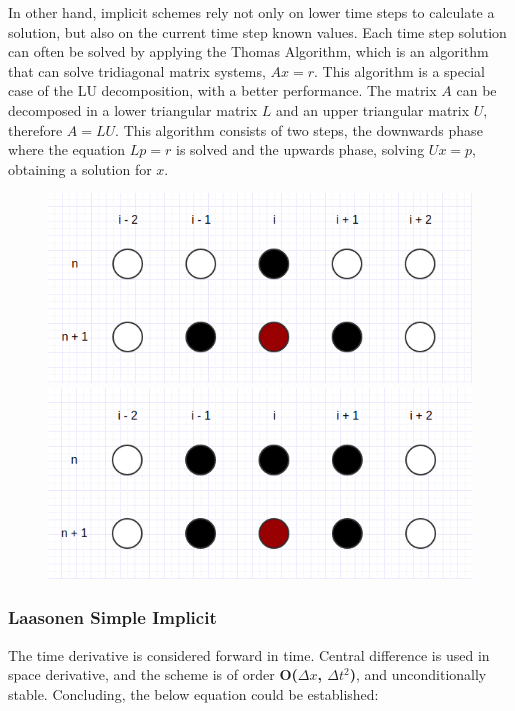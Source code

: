 \documentclass[12pt]{report}
\begin{document}
\par In other hand, implicit schemes rely not only on lower time steps to calculate a solution, but also on the current time step known values. Each time step solution can often be solved by applying the Thomas Algorithm, which is an algorithm that can solve tridiagonal matrix systems, $Ax = r$. This algorithm is a special case of the LU decomposition, with a better performance. The matrix $A$ can be decomposed in a lower triangular matrix $L$ and an upper triangular matrix $U$, therefore $A = LU$. This algorithm consists of two steps, the downwards phase where the equation $Lp = r$ is solved and the upwards phase, solving $Ux = p$, obtaining a solution for $x$. 

\begin{figure}[!htb]
\centering
\begin{minipage}{.5\textwidth}
  \centering
  \includegraphics[width=.8\linewidth]{laasonen.png}
\end{minipage}%
\begin{minipage}{.5\textwidth}
  \centering
  \includegraphics[width=.8\linewidth]{crank-nicholson.png}
\end{minipage}
\end{figure}

\subsubsection*{Laasonen Simple Implicit}
\par The time derivative is considered forward in time. Central difference is used in space derivative, and the scheme is of order \textbf{O($\Delta x $, $\Delta t ^2$)}, and unconditionally stable. Concluding, the below equation could be established:
\end{document}
